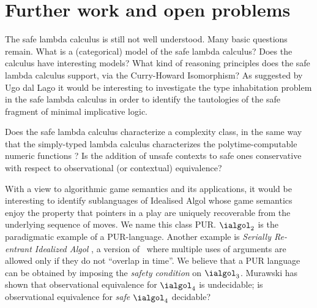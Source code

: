 
\section{Further work and open problems}

The safe lambda calculus is still not well understood. Many basic
questions remain. What is a (categorical) model of the safe lambda
calculus? Does the calculus have interesting models?  What kind of
reasoning principles does the safe lambda calculus support, via the
Curry-Howard Isomorphism? As suggested by Ugo dal Lago it would be
interesting to investigate the type inhabitation problem in the safe
lambda calculus in order to identify the tautologies of the safe
fragment of minimal implicative logic.

Does the safe lambda calculus characterize a complexity class, in
the same way that the simply-typed lambda calculus characterizes the
polytime-computable numeric functions
\cite{DBLP:conf/tlca/LeivantM93}?  Is the addition of unsafe
contexts to safe ones conservative with respect to observational (or
contextual) equivalence?

With a view to algorithmic game semantics and its applications, it
would be interesting to identify sublanguages of Idealised Algol
whose game semantics enjoy the property that pointers in a play are
uniquely recoverable from the underlying sequence of moves. We name
this class PUR. $\ialgol_2$ is the paradigmatic example of a
PUR-language. Another example is \emph{Serially Re-entrant Idealized
  Algol} \cite{abramsky:mchecking_ia}, a version of \ialgol\ where
multiple uses of arguments are allowed only if they do not ``overlap
in time''.  We believe that a PUR language can be obtained by
imposing the \emph{safety condition} on $\ialgol_3$. Murawski
\cite{Murawski2003} has shown that observational equivalence for
$\ialgol_4$ is undecidable; is observational equivalence for
\emph{safe} $\ialgol_4$ decidable?

